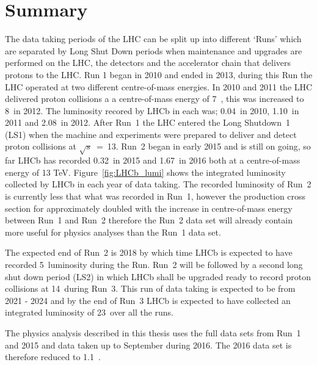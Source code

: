 \section{Summary}
\label{LHCb_data}

The data taking periods of the LHC can be split up into different `Runs' which are separated by Long Shut Down periods when maintenance and upgrades are performed on the LHC, the detectors and the accelerator chain that delivers protons to the LHC. Run 1 began in 2010 and ended in 2013, during this Run the LHC operated at two different centre-of-mass energies. In 2010 and 2011 the LHC delivered proton collisions a a centre-of-mass energy of 7~\tev, this was increased to 8~\tev in 2012. The luminosity recored by LHCb in each was; 0.04~\fb in 2010, 1.10~\fb in 2011 and 2.08~\fb in 2012. After Run~1 the LHC entered the Long Shutdown~1 (LS1) when the machine and experiments were prepared to deliver and detect proton collisions at $\sqrt{s}$~=~13. Run~2 began in early 2015 and is still on going, so far LHCb has recorded 0.32~\fb in 2015 and 1.67~\fb in 2016 both at a centre-of-mass energy of 13 TeV. Figure~\ref{fig:LHCb_lumi} shows the integrated luminosity collected by LHCb in each year of data taking. The recorded luminosity of Run~2 is currently less that what was recorded in Run~1, however the production cross section for \bhadrons approximately doubled with the increase in centre-of-mass energy between Run~1 and Run~2 therefore the Run~2 data set will already contain more \bhadrons useful for physics analyses than the Run~1 data set. 


The expected end of Run~2 is 2018 by which time LHCb is expected to have recorded 5~\fb luminosity during the Run. Run~2 will be followed by a second long shut down period (LS2) in which LHCb shall be upgraded ready to record proton collisions at 14~\tev during Run~3. This run of data taking is expected to be from 2021 - 2024 and by the end of Run~3 LHCb is expected to have collected an integrated luminosity of 23~\fb over all the runs. 

The physics analysis described in this thesis uses the full data sets from Run~1 and 2015 and data taken up to September during 2016. The 2016 data set is therefore reduced to 1.1~\fb.

